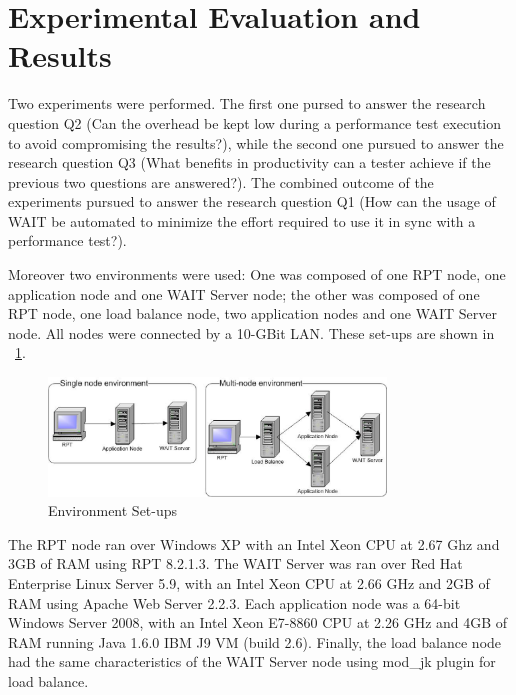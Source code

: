 \documentclass[runningheads,a4paper]{llncs}
\begin{document}
\section{Experimental Evaluation and Results}
\vspace{-5pt}

Two experiments were performed. The first one pursed to answer the
research question Q2 (Can the overhead be kept low during a performance test
execution to avoid compromising the results?), while the second one pursued to
answer the research question Q3 (What benefits in productivity can a tester achieve if the previous
two questions are answered?). The combined outcome of the experiments pursued to
answer the research question Q1 (How can the usage of WAIT be automated to
minimize the effort required to use it in sync with a performance test?).

Moreover two environments were used: One was composed of one RPT node,
one application node and one WAIT Server node; the other was composed of one RPT
node, one load balance node, two application nodes and one WAIT Server node. All
nodes were connected by a 10-GBit LAN. These set-ups are shown in \figurename
~\ref{fig_env}.
\vspace{-5pt}
\begin{figure}[!h]
\centering
\includegraphics[totalheight=.18\textheight,width=0.8\textwidth]{Environments}
\caption{Environment Set-ups}
\label{fig_env}
\end{figure}

The RPT node ran over Windows XP with an Intel Xeon CPU at
2.67 Ghz and 3GB of RAM using RPT 8.2.1.3. The WAIT Server was ran over Red Hat
Enterprise Linux Server 5.9, with an Intel Xeon CPU at 2.66 GHz and 2GB of
RAM using Apache Web Server 2.2.3. Each application node was a 64-bit Windows
Server 2008, with an Intel Xeon E7-8860 CPU at 2.26 GHz and 4GB of RAM
running Java 1.6.0 IBM J9 VM (build 2.6). Finally, the load balance node had the
same characteristics of the WAIT Server node using mod\_jk plugin for load
balance.
\vspace{-5pt}
\end{document}

